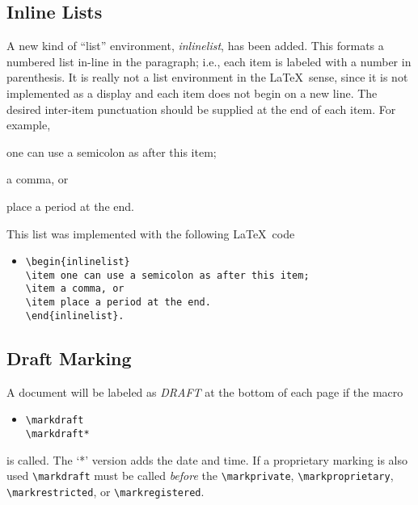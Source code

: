 \subsection{Inline Lists}
A new kind of ``list'' environment, {\it inlinelist},  has been added.
This formats a 
numbered list in-line in the paragraph; i.e., each item is labeled
with a number in parenthesis.  It is really not a
list environment in the \LaTeX\ sense, since it is not implemented as a
display and each item does not begin on a new line.  The desired
inter-item punctuation should be supplied at the end of each item.
For example, 
\begin{inlinelist}
\item one can use a semicolon as after this item;
\item a comma, or
\item place a period at the end.
\end{inlinelist}
This list was implemented with the following \LaTeX\ code
\begin{itemize}
\item[]
\verb|\begin{inlinelist}|\\
\verb|\item one can use a semicolon as after this item;|\\
\verb|\item a comma, or|\\
\verb|\item place a period at the end.|\\
\verb|\end{inlinelist}.|
\end{itemize}

\subsection{Draft Marking}
A document will be labeled as {\it DRAFT} at the bottom of each page
if the macro
\begin{itemize}
\item[]
\verb|\markdraft|\\
\verb|\markdraft*|
\end{itemize}
is called.  The `*' version adds the date and
time.  If a proprietary marking is also used \verb|\markdraft|
must be called {\it before} the \verb|\markprivate|,
\verb|\markproprietary|, \verb|\markrestricted|, or \verb|\markregistered|.
